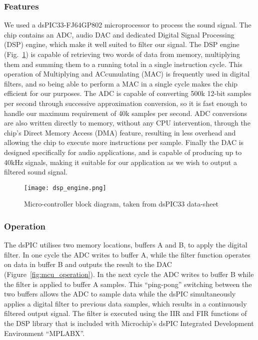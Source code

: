 \subsubsection{Features}
We used a dsPIC33-FJ64GP802 microprocessor to process the sound signal. The chip contains an ADC, audio DAC and dedicated Digital Signal Processing (DSP) engine, which make it well suited to filter our signal. The DSP engine (Fig.~\ref{fig:dsp_block}) is capable of retrieving two words of data from memory, multiplying them and summing them to a running total in a single instruction cycle. This operation of Multiplying and ACcumulating (MAC) is frequently used in digital filters, and so being able to perform a MAC in a single cycle makes the chip efficient for our purposes. The ADC is capable of converting 500k 12-bit samples per second through successive approximation conversion, so it is fast enough to handle our maximum requirement of 40k samples per second. ADC conversions are also written directly to memory, without any CPU intervention, through the chip's Direct Memory Access (DMA) feature, resulting in less overhead and allowing the chip to execute more instructions per sample. Finally the DAC is designed specifically for audio applications, and is capable of producing up to 40kHz signals, making it suitable for our application as we wish to output a filtered sound signal. 

\begin{figure}[!ht]
	\centering
		\texttt{[image: dsp\_engine.png]}
	\caption{Micro-controller block diagram, taken from dsPIC33 data-sheet \cite[p.~14]{dspic_datasheet}}
	\label{fig:dsp_block}
\end{figure}

\subsubsection{Operation}
The dsPIC utilises two memory locations, buffers A and B, to apply the digital filter. In one cycle the ADC writes to buffer A, while the filter function operates on data in buffer B and outputs the result to the DAC (Figure~\ref{fig:mcu_operation}). In the next cycle the ADC writes to buffer B while the filter is applied to buffer A samples. This ``ping-pong'' switching between the two buffers allows the ADC to sample data while the dsPIC simultaneously applies a digital filter to previous data samples, which results in a continuously filtered output signal. The filter is executed using the IIR and FIR functions of the DSP library that is included with Microchip's dsPIC Integrated Development Environment ``MPLABX''.

